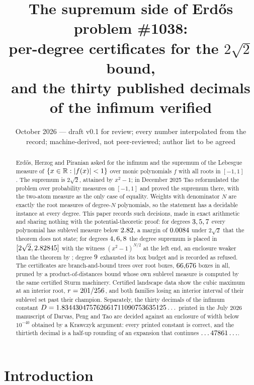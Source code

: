 \documentclass[11pt]{article}
\title{The supremum side of Erd\H{o}s problem \#1038:\\
per-degree certificates for the $2\sqrt2$ bound,\\
and the thirty published decimals of the infimum verified}
\author{\cmauthor}
\date{October 2026 --- draft v0.1 for review; every number interpolated from the record; machine-derived, not peer-reviewed; author list to be agreed}
\begin{document}
\maketitle

\begin{abstract}
Erd\H{o}s, Herzog and Piranian asked for the infimum and the supremum of the Lebesgue measure of
$\{x\in\mathbb{R}:\lvert f(x) \rvert<1\}$ over monic polynomials $f$ with all roots in $[-1,1]$. The supremum is
$2\sqrt2$, attained by $x^2-1$; in December 2025 Tao reformulated the problem over probability
measures on $[-1,1]$ and proved the supremum there, with the two-atom measure as the only
case of equality. Weights with denominator $N$ are exactly the root measures of degree-$N$
polynomials, so the statement has a decidable instance at every degree. This paper records
such decisions, made in exact arithmetic and sharing nothing with the potential-theoretic
proof: for degrees $3, 5, 7$ every polynomial has sublevel measure below $2.82$, a margin
of $0.0084$ under $2\sqrt2$ that the theorem does not state; for degrees $4, 6, 8$ the
degree supremum is placed in $[2\sqrt2,2.82845]$ with the witness $(x^2-1)^{N/2}$ at the left end,
an enclosure weaker than the theorem by \SlackEven; degree $9$ exhausted its box
budget and is recorded as refused. The certificates are branch-and-bound trees over root boxes,
$66{,}676$ boxes in all, pruned by a product-of-distances bound whose own sublevel measure is
computed by the same certified Sturm machinery. Certified landscape data show the cubic maximum
at an interior root, $r=201/256$, and both families losing an interior interval of their
sublevel set past their champion. Separately, the thirty decimals of the infimum constant
$D=1.834430475762661711090753635125\ldots$ printed in the July 2026 manuscript of Darvas, Peng and Tao are decided
against an enclosure of width below $10^{-40}$ obtained by a Krawczyk argument: every printed
constant is correct, and the thirtieth decimal is a half-up rounding of an expansion that
continues $\ldots47861\ldots$.
\end{abstract}

\section{Introduction}
\end{document}
